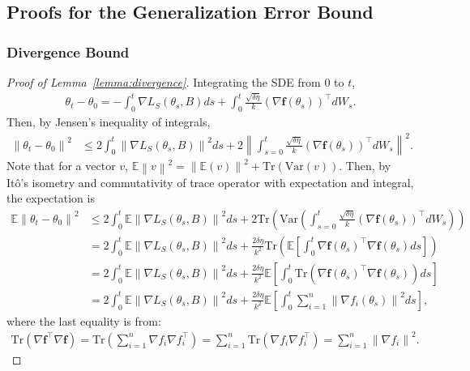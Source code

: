 \documentclass{article}
\newcommand{\norm}[1]{\left\lVert#1\right\rVert} %
\begin{document}
\subsection{Proofs for the Generalization Error Bound}
\subsubsection{Divergence Bound}
\begin{proof}[Proof of Lemma~\ref{lemma:divergence}]
	Integrating the SDE from $0$ to $t$, 
	\begin{align*}
		\theta_t - \theta_0 = - \int_0^t \nabla L_S(\theta_s, B) ds + \int_{0}^t \frac{\sqrt{\delta \eta}}{k} ( \nabla \textbf{f}(\theta_s))^\top dW_s.
	\end{align*}
	Then, by Jensen's inequality of integrals,
	\begin{align*}
		\norm{\theta_t - \theta_0}^2 
		&\leq 2  \int_0^t \norm{\nabla L_S(\theta_s, B)}^2 ds +2 \norm{\int_{s=0}^t \frac{\sqrt{\delta \eta}}{k} ( \nabla \textbf{f}(\theta_s))^\top dW_s}^2.& 
	\end{align*}
	Note that for a vector $v$, $\mathbb{E}\norm{v}^2 = \norm{\mathbb{E}(v)}^2 + \mathrm{Tr}(\mathrm{Var}(v))$. 
	Then, by It\^o's isometry and commutativity of trace operator with expectation and integral, the expectation is
	\begin{align*}
		\mathbb{E} \norm{\theta_t - \theta_0}^2 &\leq 2\int_0^t \mathbb{E} \norm{\nabla L_S(\theta_s, B)}^2 ds + 2 \mathrm{Tr}\left(\mathrm{Var}\left(\int_{s=0}^t \frac{\sqrt{\delta \eta}}{k} ( \nabla \textbf{f}(\theta_s))^\top dW_s\right)\right) \\
		&= 2  \int_0^t \mathbb{E} \norm{\nabla L_S(\theta_s, B)}^2 ds +  \frac{2\delta \eta}{k^2} \mathrm{Tr} \left( \mathbb{E}  \left[\int_{0}^t \nabla \mathbf{f}(\theta_s)^\top  \nabla \mathbf{f}(\theta_s)  ds \right] \right)\\
		& = 2 \int_0^t \mathbb{E} \norm{\nabla L_S(\theta_s, B)}^2 ds + \frac{2\delta \eta}{k^2} \mathbb{E}  \left[\int_{0}^t  \mathrm{Tr} \left( \nabla \mathbf{f}(\theta_s)^\top  \nabla \mathbf{f}(\theta_s) \right) ds \right] \\
		&= 2  \int_0^t \mathbb{E} \norm{\nabla L_S(\theta_s, B)}^2 ds + \frac{2\delta \eta}{k^2} \mathbb{E}  \left[\int_{0}^t  \sum_{i=1}^n \norm{\nabla f_i (\theta_s)}^2 ds \right],
	\end{align*}
	where the last equality is from:
	\begin{align*}
		\mathrm{Tr}(\nabla \mathbf{f}^\top \nabla \mathbf{f})  = \mathrm{Tr}(\sum_{i=1}^n \nabla f_i \nabla f_i^\top) = \sum_{i=1}^n \mathrm{Tr}( \nabla f_i \nabla f_i^\top) = \sum_{i=1}^n \norm{\nabla f_i}^2.

\end{align*}
\end{proof}
\end{document}
